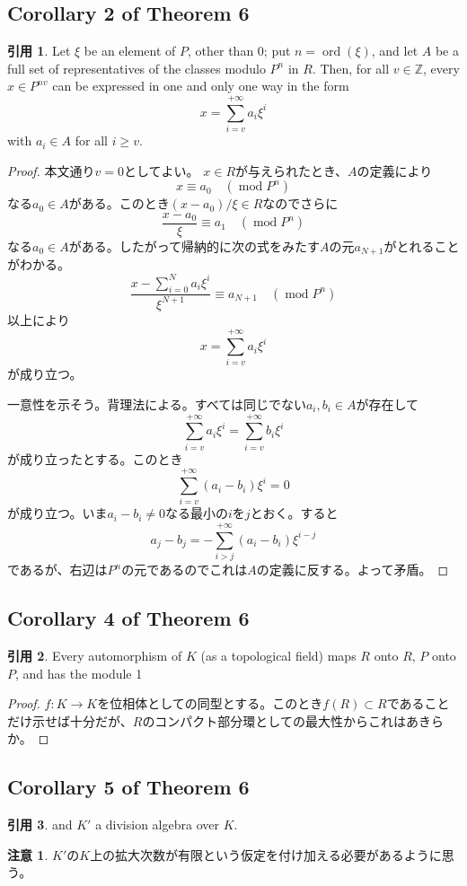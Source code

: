 \documentclass[12pt]{jsarticle}%
\renewenvironment{leftbar}{%
  \renewcommand\FrameCommand{\vrule width 1pt \hspace{10pt}}%
  \MakeFramed {\advance\hsize-\width \FrameRestore}}%
 {\endMakeFramed}
\newcommand{\barquo}[1]{\begin{leftbar} \begin{quo} #1 \end{quo} \end{leftbar}}%
\newcommand{\bfsubsection}[1]{\subsection*{\textbf{#1}}}
\theoremstyle{definition}%
\newtheorem*{rem}{注意}
\newtheorem*{quo}{引用}
\newcommand{\f}[2]{\frac{#1}{#2}}%
\DeclareMathOperator{\ord}{ord}
\DeclareMathOperator{\module}{mod}%
\newcommand{\bbz}{{\mathbb Z}}
\newcommand{\Z}{\bbz}
\begin{document}
\bfsubsection{Corollary 2 of Theorem 6}
\barquo{
Let $\xi$ be an element of $P$, other than $0$; put $n = \ord(\xi)$, and let $A$ be a full set of representatives of the classes modulo $P^n$ in $R$. Then, for all $v \in \Z$, every $x \in P^{nv}$ can be expressed in one and only one way in the form
\[
x = \sum_{i = v}^{+ \infty} a_i \xi^i
\]
with $a_i \in A$ for all $i \geq v$.
}
\begin{proof}
  本文通り$v = 0$としてよい。
  $x \in R$が与えられたとき、$A$の定義により
\[
x \equiv a_0 \quad (\module P^n)
\]
なる$a_0 \in A$がある。このとき$(x- a_0)/ \xi \in R$なのでさらに
\[
\f{x - a_0}{\xi} \equiv a_1 \quad (\module P^n)
\]
なる$a_0 \in A $がある。したがって帰納的に次の式をみたす$A$の元$a_{N+1}$がとれることがわかる。
  \[
\frac{x - \sum_{i = 0}^N a_i \xi^i}{\xi^{N+1}} \equiv a_{N+1} \quad (\module  P^n)
  \]
  以上により
  \[
  x = \sum_{i = v}^{+ \infty} a_i \xi^i
  \]
  が成り立つ。

  一意性を示そう。背理法による。すべては同じでない$a_i, b_i \in A$が存在して
  \[
  \sum_{i = v}^{+ \infty} a_i \xi^i = \sum_{i = v}^{+ \infty} b_i \xi^i
  \]
  が成り立ったとする。このとき
  \[
    \sum_{i = v}^{+ \infty} (a_i - b_i) \xi^i = 0
  \]
  が成り立つ。いま$a_i - b_i \neq 0$なる最小の$i$を$j$とおく。すると
  \[
  a_j - b_j = - \sum_{i > j}^{+ \infty} (a_i - b_i) \xi^{i-j}
  \]
  であるが、右辺は$P^n$の元であるのでこれは$A$の定義に反する。よって矛盾。

\end{proof}


\bfsubsection{Corollary 4 of Theorem 6}
\barquo{
Every automorphism of $K$ (as a topological field) maps $R$ onto $R$, $P$ onto $P$, and has the module 1
}
\begin{proof}
  $f \colon K \to K$を位相体としての同型とする。このとき$f(R) \subset R$であることだけ示せば十分だが、$R$のコンパクト部分環としての最大性からこれはあきらか。
\end{proof}



\bfsubsection{Corollary 5 of Theorem 6}
\barquo{
and $K'$ a division algebra over $K$.
}
\begin{rem}
  $K'$の$K$上の拡大次数が有限という仮定を付け加える必要があるように思う。
\end{rem}
\end{document}
